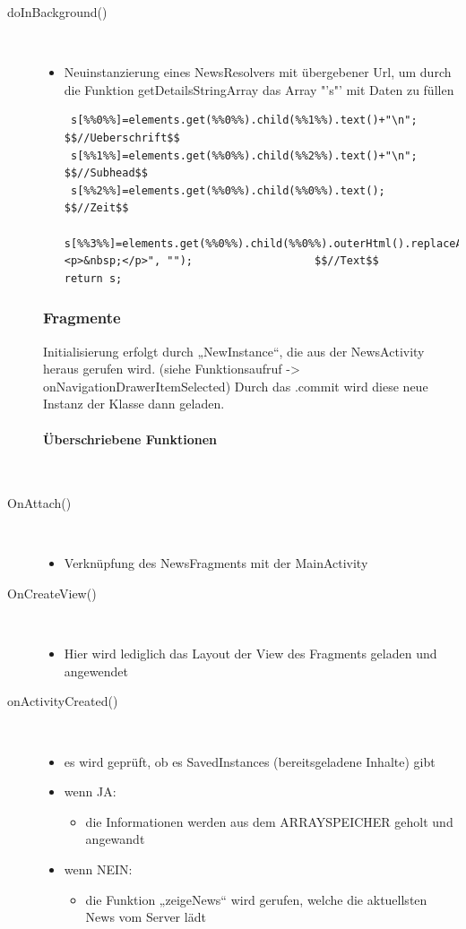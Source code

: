 \begin{description}
\item[doInBackground()]~\par
\begin{itemize}
\item Neuinstanzierung eines NewsResolvers mit übergebener Url, um durch die Funktion getDetailsStringArray das Array "'s"' mit Daten zu füllen
\begin{lstlisting}
 s[%%0%%]=elements.get(%%0%%).child(%%1%%).text()+"\n";   $$//Ueberschrift$$
 s[%%1%%]=elements.get(%%0%%).child(%%2%%).text()+"\n";   $$//Subhead$$
 s[%%2%%]=elements.get(%%0%%).child(%%0%%).text();        $$//Zeit$$
 s[%%3%%]=elements.get(%%0%%).child(%%0%%).outerHtml().replaceAll("<p>&nbsp;</p>", "");                   $$//Text$$
return s; 
\end{lstlisting}
\end{itemize}
\newpage
\subsubsection{Fragmente}
Initialisierung erfolgt durch „NewInstance“, die aus der NewsActivity heraus gerufen wird. (siehe Funktionsaufruf -> onNavigationDrawerItemSelected)
Durch das .commit wird diese neue Instanz der Klasse dann geladen.
\paragraph{Überschriebene Funktionen}
\ \\[1em]
\item[OnAttach()]~\par
\begin{itemize}
\item Verknüpfung des NewsFragments mit der MainActivity
\end{itemize}

\item[OnCreateView()]~\par
\begin{itemize}
\item Hier wird lediglich das Layout der View des Fragments geladen und angewendet
\end{itemize}

\item[onActivityCreated()]~\par
\begin{itemize}
\item es wird geprüft, ob es SavedInstances (bereitsgeladene Inhalte) gibt
\item wenn JA:
\begin{itemize}
\item die Informationen werden aus dem ARRAYSPEICHER geholt und angewandt
\end{itemize}
\item wenn NEIN:
\begin{itemize}
\item die Funktion „zeigeNews“ wird gerufen, welche die aktuellsten News vom Server lädt
\end{itemize}
\end{itemize}


\end{description}
